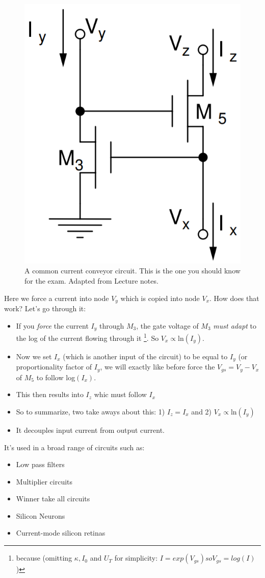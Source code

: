 \begin{figure}[H]
    \centering
    \includegraphics[width=0.8\linewidth]{../../Figures/Current_Conveyor_Circuit_2.PNG}
    \caption{A common current conveyor circuit. This is the one you should know for the exam. Adapted from Lecture notes.}
    \label{fig:Current_Conveyor_Circuit_2}
\end{figure}

Here we force a current into node $V_y$ which is copied into node $V_x$. How does that work? Let's go through it: 
\begin{itemize}
    \item If you \textit{force} the current $I_y$ through $M_3$, the gate voltage of $M_3$ \textit{must adapt} to the log of the current flowing through it \footnote{because (omitting $\kappa, I_0$ and $U_T$ for simplicity: $I = exp(V_{gs}) so V_{gs} = log(I)$)}.  So $V_x \propto \mathrm{ln}(I_y)$.
    \item Now we set $I_x$ (which is another input of the circuit) to be equal to $I_y$ (or proportionality factor of $I_y$, we will exactly like before force the $V_{gs} = V_y - V_x$ of $M_5$ to follow log$(I_x)$. 
    \item This then results into $I_z$ whic must follow $I_x$
    \item So to summarize, two take aways about this: 1) $I_z = I_x$ and 2) $V_x \propto \mathrm{ln}(I_y)$
    \item It decouples input current from output current. 
\end{itemize}

It's used in a broad range of circuits such as: 
\begin{itemize}
    \item Low pass filters
    \item Multiplier circuits 
    \item Winner take all circuits 
    \item Silicon Neurons
    \item Current-mode silicon retinas
\end{itemize}